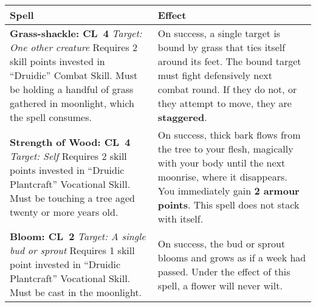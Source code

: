 \begin{center}
  \begin{tabular}{|m{} m{}|} 
      \hline 
      
      \textbf{Spell} & \textbf{Effect} \\ 
      
      \hline

      \hspace*{.8em} \textbf{Grass-shackle: CL~4} \newline
      \hspace*{.8em} \textit{Target: One other creature} \newline \newline
      Requires 2 skill points invested in “Druidic” Combat Skill. \newline \newline
      Must be holding a handful of grass gathered in moonlight, which the spell consumes. & 
        On success, a single target is bound by grass that ties itself around its feet. The bound target must fight defensively next combat round. If they do not, or they attempt to move, they are \textbf{staggered}. \\
      
      \hline

      \hspace*{.8em} \textbf{Strength of Wood: CL~4} \newline
      \hspace*{.8em} \textit{Target: Self} \newline \newline
      Requires 2 skill points invested in “Druidic Plantcraft” Vocational Skill.\newline \newline
      Must be touching a tree aged twenty or more years old. &
        On success, thick bark flows from the tree to your flesh, magically with your body until the next moonrise, where it disappears. You immediately gain \textbf{2 armour points}. This spell does not stack with itself. \\
      
      \hline

      \hspace*{.8em} \textbf{Bloom: CL~2} \newline
      \hspace*{.8em} \textit{Target: A single bud or sprout} \newline \newline
      Requires 1 skill point invested in “Druidic Plantcraft” Vocational Skill.\newline \newline
      Must be cast in the moonlight. &
        On success, the bud or sprout blooms and grows as if a week had passed. Under the effect of this spell, a flower will never wilt.\\


\end{tabular}
\end{center}
